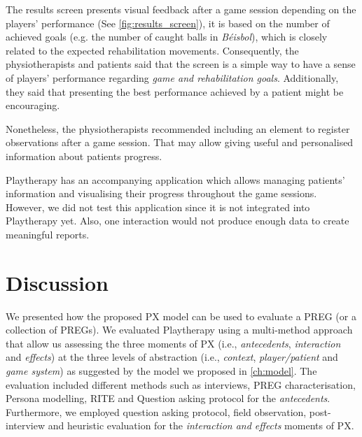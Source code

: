 The results screen presents visual feedback after a game session depending on the players' performance (See \autoref{fig:results_screen}), it is based on the number of achieved goals (e.g. the number of caught balls in \textit{B\'eisbol}), which is closely related to the expected rehabilitation movements. Consequently, the physiotherapists and patients said that the screen is a simple way to have a sense of players' performance regarding \textit{game and rehabilitation goals}. Additionally, they said that presenting the best performance achieved by a patient might be encouraging.

Nonetheless, the physiotherapists recommended including an element to register observations after a game session. That may allow giving useful and personalised information about patients progress.

Playtherapy has an accompanying application which allows managing patients' information and visualising their progress throughout the game sessions. However, we did not test this application since it is not integrated into Playtherapy yet. Also, one interaction would not produce enough data to create meaningful reports.

\section{Discussion}

We presented how the proposed \ac{PX} model can be used to evaluate a \ac{PREG} (or a collection of \acp{PREG}). We evaluated Playtherapy using a multi-method approach that allow us assessing the three moments of \ac{PX} (i.e., \textit{antecedents}, \textit{interaction} and \textit{effects}) at the three levels of abstraction (i.e., \textit{context}, \textit{player/patient} and \textit{game system}) as suggested by the model we proposed in \autoref{ch:model}. The evaluation included different methods such as interviews, \ac{PREG} characterisation, Persona modelling, \ac{RITE} and Question asking protocol for the \textit{antecedents}. Furthermore, we employed question asking protocol, field observation, post-interview and heuristic evaluation for the \textit{interaction and effects} moments of \ac{PX}.

